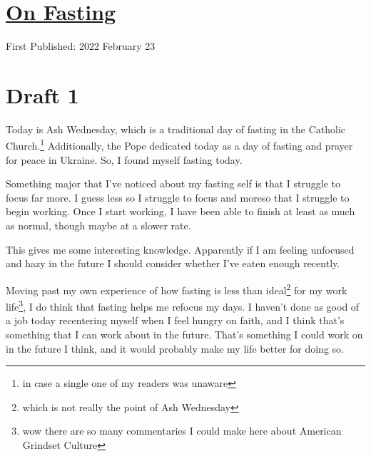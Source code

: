 \documentclass[12pt]{article}[titlepage]
\newcommand{\1}{\={a}}
\newcommand{\2}{\={e}}
\newcommand{\3}{\={\i}}
\newcommand{\4}{\=o}
\newcommand{\5}{\=u}
\newcommand{\6}{\={A}}
\renewcommand{\,}{\textsuperscript{,}}
\begin{document}
\doublespacing
\section{\href{fasting.html}{On Fasting}}
First Published: 2022 February 23

\section{Draft 1}
Today is Ash Wednesday, which is a traditional day of fasting in the Catholic Church.\footnote{in case a single one of my readers was unaware}
Additionally, the Pope dedicated today as a day of fasting and prayer for peace in Ukraine.
So, I found myself fasting today.

Something major that I've noticed about my fasting self is that I struggle to focus far more.
I guess less so I struggle to focus and moreso that I struggle to begin working.
Once I start working, I have been able to finish at least as much as normal, though maybe at a slower rate.

This gives me some interesting knowledge.
Apparently if I am feeling unfocused and hazy in the future I should consider whether I've eaten enough recently.

Moving past my own experience of how fasting is less than ideal\footnote{which is not really the point of Ash Wednesday} for my work life\footnote{wow there are so many commentaries I could make here about American Grindset Culture}, I do think that fasting helps me refocus my days.
I haven't done as good of a job today recentering myself when I feel hungry on faith, and I think that's something that I can work about in the future.
That's something I could work on in the future I think, and it would probably make my life better for doing so.
\end{document}
